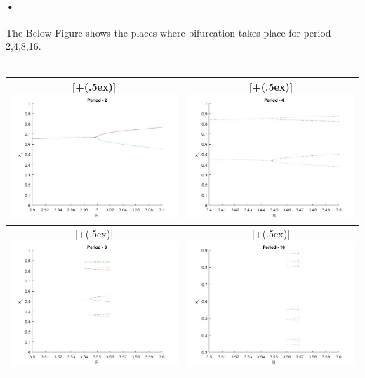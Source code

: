 \documentclass[11pt,a4paper]{article}
\newcommand*{\addheight}[2][.5ex]{%
  \raisebox{0pt}[\dimexpr\height+(#1)\relax]{#2}%
}
\begin{document}
\paragraph{•}
The Below Figure shows the places where bifurcation takes place for period 2,4,8,16.\\ \\
\begin{table}[H]
\centering
\begin{tabular}{|c|c|}
	\hline
	\addheight{\includegraphics[width=80mm]{images/prob21.jpg}} &
    \addheight{\includegraphics[width=80mm]{images/prob22.jpg}} \\
    \hline
    \addheight{\includegraphics[width=80mm]{images/prob23.jpg}} &
    \addheight{\includegraphics[width=80mm]{images/prob24.jpg}} \\
	\hline
\end{tabular}
\end{table}
\end{document}
